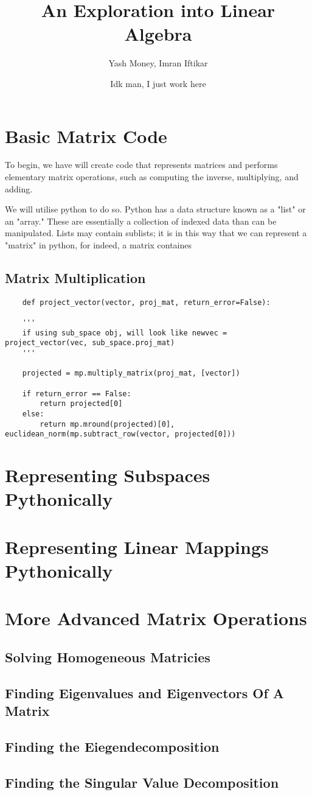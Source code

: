 \documentclass[12pt, a4paper]{article}
\title{An Exploration into Linear Algebra}
\author{Yash Money, Imran Iftikar}
\date{Idk man, I just work here}
\begin{document}
\maketitle



\section{Basic Matrix Code}

To begin, we have will create code that represents matrices and
performs elementary matrix operations, such as computing the inverse, 
multiplying, and adding. 

We will utilise python to do so. Python has a data structure known as a "list" or an "array."
These are essentially a collection of indexed data than can be manipulated. Lists may contain sublists; it is in this way
that we can represent a "matrix" in python, for indeed, a matrix containes

\subsection{Matrix Multiplication}

\begin{lstlisting}
    def project_vector(vector, proj_mat, return_error=False):

    '''
    if using sub_space obj, will look like newvec = project_vector(vec, sub_space.proj_mat)
    '''
    
    projected = mp.multiply_matrix(proj_mat, [vector])

    if return_error == False:
        return projected[0]
    else:
        return mp.mround(projected)[0], euclidean_norm(mp.subtract_row(vector, projected[0]))
\end{lstlisting}

\section{Representing Subspaces Pythonically}

\section{Representing Linear Mappings Pythonically}

\section{More Advanced Matrix Operations}

\subsection{Solving Homogeneous Matricies}

\subsection{Finding Eigenvalues and Eigenvectors Of A Matrix}

\subsection{Finding the Eiegendecomposition}

\subsection{Finding the Singular Value Decomposition}
\end{document}
